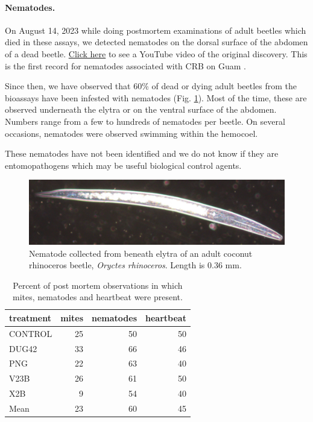 \documentclass[12pt,letterpaper,english,bibliography=totocnumbered, abstract=on]{scrartcl}
\begin{document}
\paragraph{Nematodes.} On August 14, 2023 while doing postmortem examinations of adult beetles which died in these assays, we detected nematodes on the dorsal surface of the abdomen of a dead beetle. \href{https://www.youtube.com/shorts/dKVup7q7FF0}{Click here} to see a YouTube video of the original discovery. This is the first record for nematodes associated with CRB on Guam \cite{Moore2023nematodes}.

Since then, we have observed that 60\%  of dead or dying adult beetles from the bioassays have been infested with nematodes (Fig. \ref{fig:nematode2}). Most of the time, these are observed underneath the elytra or on the ventral surface of the abdomen. Numbers range from a few to hundreds of nematodes per beetle. On several occasions, nematodes were observed swimming within the hemocoel.

These nematodes have not been identified and we do not know if they are entomopathogens which may be useful biological control agents.

\begin{figure}[H]
	\centering
	\includegraphics[width=0.7\linewidth]{images/nematode2}
	\caption{Nematode collected from beneath elytra of an adult coconut rhinoceros beetle, \textit{Oryctes rhinoceros}. Length is 0.36 mm.}
	\label{fig:nematode2}
\end{figure}

\begin{table}[H]
	\centering
	\caption{Percent of post mortem observations in which mites, nematodes and heartbeat were present.}
	\label{ornv detection}

	\begin{tabular}{lrrr}
		\hline
		treatment &  mites &  nematodes &  heartbeat \\
		\hline
		CONTROL &         25 &        50 &             50 \\
		DUG42 &         33 &        66 &             46 \\
		PNG &         22 &        63 &             40 \\
		V23B &         26 &        61 &             50 \\
		X2B &          9 &        54 &             40 \\
		\hline
		Mean & 23 & 60 & 45 \\
		\hline
	\end{tabular}
\end{table}
\end{document}

